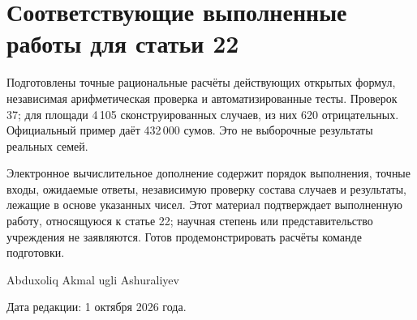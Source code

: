 \documentclass[14pt,a4paper]{extarticle}
\begin{document}
\section*{Соответствующие выполненные работы для статьи 22}
Подготовлены точные рациональные расчёты действующих открытых формул, независимая арифметическая проверка и автоматизированные тесты. Проверок 37; для площади 4\,105 сконструированных случаев, из них 620 отрицательных. Официальный пример даёт 432\,000 сумов. Это не выборочные результаты реальных семей.

Электронное вычислительное дополнение содержит порядок выполнения, точные входы, ожидаемые ответы, независимую проверку состава случаев и результаты, лежащие в основе указанных чисел. Этот материал подтверждает выполненную работу, относящуюся к статье 22; научная степень или представительство учреждения не заявляются. Готов продемонстрировать расчёты команде подготовки.

Abduxoliq Akmal ugli Ashuraliyev\par
Дата редакции: 1 октября 2026 года.
\end{document}
